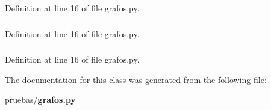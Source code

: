 \-Definition at line 16 of file grafos.\-py.

\subsubsection[{figure}]{}\label{classpruebas_1_1grafos_1_1_window_af82b325672275258e5a12a04a38f31e8}


\-Definition at line 16 of file grafos.\-py.

\subsubsection[{toolbar}]{}\label{classpruebas_1_1grafos_1_1_window_aefacb50b71d1776f4d5da9b7ade48c24}


\-Definition at line 16 of file grafos.\-py.



\-The documentation for this class was generated from the following file\-:\begin{DoxyCompactItemize}
\item 
pruebas/{\bf grafos.\-py}\end{DoxyCompactItemize}
